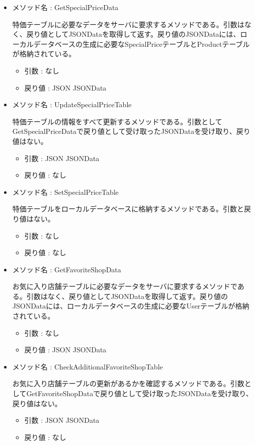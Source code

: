 \documentclass[a4j]{jarticle}
\begin{document}
\begin{itemize}
	\item メソッド名 : GetSpecialPriceData

	特価テーブルに必要なデータをサーバに要求するメソッドである。引数はなく、戻り値としてJSONDataを取得して返す。戻り値のJSONDataには、ローカルデータベースの生成に必要なSpecialPriceテーブルとProductテーブルが格納されている。
	\begin{itemize}
		\item 引数 : なし
		\item 戻り値 : JSON JSONData
	\end{itemize}

	\item メソッド名 : UpdateSpecialPriceTable

	特価テーブルの情報をすべて更新するメソッドである。引数としてGetSpecialPriceDataで戻り値として受け取ったJSONDataを受け取り、戻り値はない。
     \begin{itemize}
		\item 引数 : JSON JSONData
		\item 戻り値 : なし
	\end{itemize}

	\item メソッド名 : SetSpecialPriceTable

	特価テーブルをローカルデータベースに格納するメソッドである。引数と戻り値はない。
	\begin{itemize}
		\item 引数 : なし
		\item 戻り値 : なし
	\end{itemize}

	\item メソッド名 : GetFavoriteShopData

	お気に入り店舗テーブルに必要なデータをサーバに要求するメソッドである。引数はなく、戻り値としてJSONDataを取得して返す。戻り値のJSONDataには、ローカルデータベースの生成に必要なUserテーブルが格納されている。
	\begin{itemize}
		\item 引数 : なし
		\item 戻り値 : JSON JSONData
	\end{itemize}

	\item メソッド名 : CheckAdditionalFavoriteShopTable

	お気に入り店舗テーブルの更新があるかを確認するメソッドである。引数としてGetFavoriteShopDataで戻り値として受け取ったJSONDataを受け取り、戻り値はない。
	\begin{itemize}
		\item 引数 : JSON JSONData
		\item 戻り値 : なし
	\end{itemize}


\end{itemize}
\end{document}
